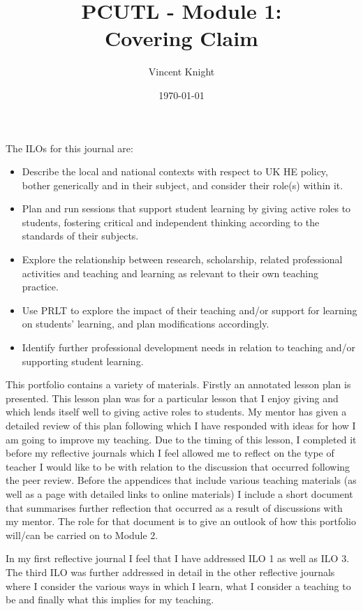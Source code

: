 \documentclass[12pt]{article}
\title{PCUTL - Module 1:\\ Covering Claim}
\author{Vincent Knight}
\date{\today}
\begin{document}
\maketitle

The ILOs for this journal are:
\begin{itemize}
\item Describe the local and national contexts with respect to UK HE policy, bother generically and in their subject, and consider their role(s) within it.
\item Plan and run sessions that support student learning by giving active roles to students, fostering critical and independent thinking according to the standards of their subjects.
\item Explore the relationship between research, scholarship, related professional activities and teaching and learning as relevant to their own teaching practice.
\item Use PRLT to explore the impact of their teaching and/or support for learning on students' learning, and plan modifications accordingly.
\item Identify further professional development needs in relation to teaching and/or supporting student learning.
\end{itemize}

This portfolio contains a variety of materials. Firstly an annotated lesson plan is presented. This lesson plan was for a particular lesson that I enjoy giving and which lends itself well to giving active roles to students. My mentor has given a detailed review of this plan following which I have responded with ideas for how I am going to improve my teaching. Due to the timing of this lesson, I completed it before my reflective journals which I feel allowed me to reflect on the type of teacher I would like to be with relation to the discussion that occurred following the peer review. Before the appendices that include various teaching materials (as well as a page with detailed links to online materials) I include a short document that summarises further reflection that occurred as a result of discussions with my mentor. The role for that document is to give an outlook of how this portfolio will/can be carried on to Module 2.

In my first reflective journal I feel that I have addressed ILO 1 as well as ILO 3. The third ILO was further addressed in detail in the other reflective journals where I consider the various ways in which I learn, what I consider a teaching to be and finally what this implies for my teaching.
\end{document}
